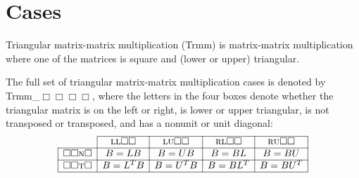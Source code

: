 \chapter{Cases}
Triangular matrix-matrix multiplication ({\sc Trmm}) 
is matrix-matrix multiplication where one of the matrices is square and (lower or upper) triangular.

The full set of 
triangular matrix-matrix multiplication cases 
is denoted by {\sc Trmm\_$\Box \Box \Box \Box $}, 
where the letters in the four boxes denote whether the 
triangular matrix is on the {\sc l}eft or {\sc r}ight,
is {\sc l}ower or {\sc u}pper triangular, 
is {\sc n}ot transposed or {\sc t}ransposed, 
and has a {\sc n}onunit or {\sc u}nit diagonal:
\[
\begin{array}{c |  c   |   c  | c | c |} \cline{2-5}
&
{\mbox{\sc l} \mbox{\sc l} \Box \Box }
&
{\mbox{\sc l} \mbox{\sc u} \Box \Box }
&
{\mbox{\sc r} \mbox{\sc l} \Box \Box }
&
{\mbox{\sc r} \mbox{\sc u} \Box \Box }
  \\
\hline
\multicolumn{1}{|c |}{ \Box \Box \mbox{\sc n} \Box} & B = L B & B = U B & B = B L & B = B U \\
\hline
\multicolumn{1}{|c |}{ \Box \Box \mbox{\sc t} \Box} & B = L^T B & B = U^T B & B = B L^T & B = B U^T \\
\hline
\end{array}
\]
